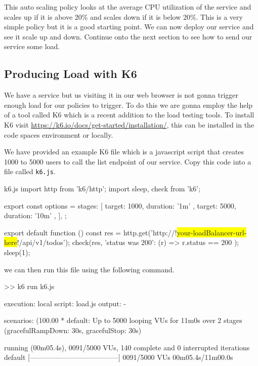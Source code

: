 \documentclass{csse4400}
\begin{document}
This auto scaling policy looks at the average CPU utilization of the service and scales up if it is above 20\% and scales down if it is below 20\%. This is a very simple policy but it is a good starting point. We can now deploy our service and see it scale up and down. Continue onto the next section to see how to send our service some load.

\subsection{Producing Load with K6}

We have a service but us visiting it in our web browser is not gonna trigger enough load for our policies to trigger. To do this we are gonna employ the help of a tool called K6 which is a recent addition to the load testing tools. To install K6 visit \url{https://k6.io/docs/get-started/installation/}, this can be installed in the code spaces environment or locally.

We have provided an example K6 file which is a javascript script that creates 1000 to 5000 users to call the list endpoint of our service. Copy this code into a file called \texttt{k6.js}.

\begin{code}[language=javascript,numbers=none,escapechar=!]{k6.js}
import http from 'k6/http';
import { sleep, check } from 'k6';

export const options = {
  stages: [
    { target: 1000, duration: '1m' },
    { target: 5000, duration: '10m' },
  ],
};

export default function () {
  const res = http.get('http://!\colorbox{yellow}{your-loadBalancer-url-here}!/api/v1/todos');
  check(res, { 'status was 200': (r) => r.status == 200 });
  sleep(1);
}
\end{code}

we can then run this file using the following command.

\begin{code}[language=bash,numbers=none,keepspaces=true]{}
>> k6 run k6.js
\end{code}

\begin{code}[language=bash,numbers=none,keepspaces=true]{}
execution: local
  script: load.js
  output: -

scenarios: (100.00%
        * default: Up to 5000 looping VUs for 11m0s over 2 stages (gracefulRampDown: 30s, gracefulStop: 30s)


running (00m05.4s), 0091/5000 VUs, 140 complete and 0 interrupted iterations
default   [--------------------------------------] 0091/5000 VUs  00m05.4s/11m00.0s

\end{code}
\end{document}
